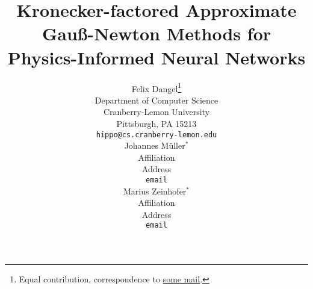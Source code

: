 \newcommand{\papertitle}{%
  Kronecker-factored Approximate Gauß-Newton Methods for Physics-Informed Neural Networks 
}
\title{\papertitle}

%

\author{%
  Felix Dangel\thanks{Equal contribution, correspondence to \url{some mail}.}\\
  Department of Computer Science\\
  Cranberry-Lemon University\\
  Pittsburgh, PA 15213 \\
  \texttt{hippo@cs.cranberry-lemon.edu} \\
  \And
  Johannes M\"uller$^*$\\
  Affiliation \\
  Address \\
  \texttt{email} \\
  \And
  Marius Zeinhofer$^*$\\
  Affiliation \\
  Address \\
  \texttt{email} \\
}
